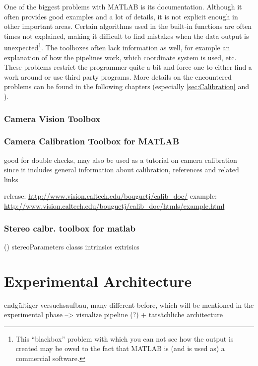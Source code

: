 One of the biggest problems with MATLAB is its documentation. Although it often provides good examples and a lot of details, it is not explicit enough in other important areas. Certain algorithms used in the built-in functions are often times not explained, making it difficult to find mistakes when the data output is unexpected\footnote{This \enquote{blackbox} problem with which you can not see how the output is created may be owed to the fact that MATLAB is (and is used as) a commercial software.}. The toolboxes often lack information as well, for example an explanation of how the pipelines work, which coordinate system is used, etc. These problems restrict the programmer quite a bit and force one to either find a work around or use third party programs. More details on the encountered problems can be found in the following chapters (especially \autoref{sec:Calibration} and ).

\subsubsection{Camera Vision Toolbox}

\subsubsection{Camera Calibration Toolbox for MATLAB}
\cite{Bouguet.2015}
good for double checks, may also be used as a tutorial on camera calibration since it includes general information about calibration, references and related links

release: \url{http://www.vision.caltech.edu/bouguetj/calib_doc/}
example: \url{http://www.vision.caltech.edu/bouguetj/calib_doc/htmls/example.html}

\subsubsection{Stereo calbr. toolbox for matlab}\label{ssec:stereoCalibToolbox}
(\cite{StereoCalib.2016})
stereoParameters classs
intrinsics
extrisics


\section{Experimental Architecture} \label{sec:architecture}
endgültiger versuchsaufbau, many different before, which will be mentioned in the experimental phase --> visualize pipeline (?) + tatsächliche architecture

